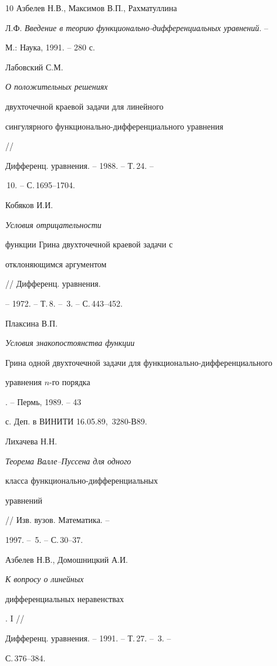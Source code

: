 \begin{thebibliography} {10}
 Азбелев Н.В., Максимов В.П., Рахматуллина


Л.Ф. {\em Введение в теорию функционально-дифференциальных уравнений}. --


М.: Наука, 1991. -- 280 с.





 Лабовский С.М. {\em О положительных решениях


двухточечной краевой задачи для линейного


сингулярного функционально-дифференциального уравнения} //


Дифференц. уравнения. -- 1988. -- Т.\,24. --


\No\,10. -- С.\,1695--1704.





 Кобяков И.И. {\em Условия отрицательности


функции Грина двухточечной краевой задачи с


отклоняющимся аргументом} // Дифференц. уравнения.


-- 1972. -- Т.\,8. -- \No\,3. -- С.\,443--452.





 Плаксина В.П. {\em Условия знакопостоянства функции


Грина одной двухточечной задачи для функционально-дифференциального


уравнения $n$-го порядка}. -- Пермь, 1989. -- 43


с. Деп. в ВИНИТИ 16.05.89, \No\,3280-В89.





 Лихачева Н.Н. {\em Теорема Валле--Пуссена для одного


класса функционально-дифференциальных


уравнений} // Изв. вузов. Математика. --


1997. -- \No\,5. -- С.\,30--37.





 Азбелев Н.В., Домошницкий А.И.


{\em К вопросу о линейных


дифференциальных неравенствах}. I //


Дифференц. уравнения. -- 1991. -- Т.\,27. -- \No\,3. --


С.\,376--384.






\end{thebibliography}
